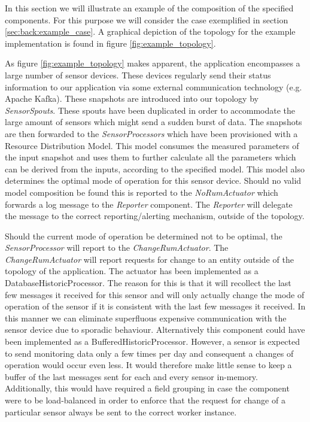 In this section we will illustrate an example of the composition of the specified components. For this purpose we will consider the case exemplified in section \ref{sec:back:example_case}. A graphical depiction of the topology for the example implementation is found in figure \ref{fig:example_topology}. 

As figure \ref{fig:example_topology} makes apparent, the application encompasses a large number of sensor devices. These devices regularly send their status information to our application via some external communication technology (e.g. Apache Kafka). These snapshots are introduced into our topology by \emph{SensorSpouts}. These spouts have been duplicated in order to accommodate the large amount of sensors which might send a sudden burst of data. The snapshots are then forwarded to the \emph{SensorProcessors} which have been provisioned with a Resource Distribution Model. This model consumes the measured parameters of the input snapshot and uses them to further calculate all the parameters which can be derived from the inputs, according to the specified model. This model also determines the optimal mode of operation for this sensor device. Should no valid model composition be found this is reported to the \emph{NoRumActuator} which forwards a log message to the \emph{Reporter} component. The \emph{Reporter} will delegate the message to the correct reporting/alerting mechanism, outside of the topology. 

Should the current mode of operation be determined not to be optimal, the \emph{SensorProcessor} will report to the \emph{ChangeRumActuator}. The \emph{ChangeRumActuator} will report requests for change to an entity outside of the topology of the application. The actuator has been implemented as a DatabaseHistoricProcessor. The reason for this is that it will recollect the last few messages it received for this sensor and will only actually change the mode of operation of the sensor if it is consistent with the last few messages it received. In this manner we can eliminate superfluous expensive communication with the sensor device due to sporadic behaviour. Alternatively this component could have been implemented as a BufferedHistoricProcessor. However, a sensor is expected to send monitoring data only a few times per day and consequent a changes of operation would occur even less. It would therefore make little sense to keep a buffer of the last messages sent for each and every sensor in-memory. Additionally, this would have required a field grouping in case the component were to be load-balanced in order to enforce that the request for change of a particular sensor always be sent to the correct worker instance.

